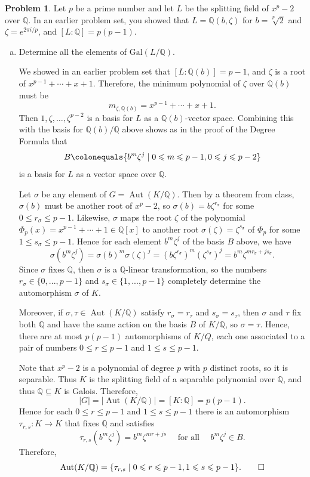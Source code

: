 \documentclass[11pt]{article}
\DeclareMathOperator{\Aut}{Aut}
\newcommand{\Q}{\mathbb{Q}}
\theoremstyle{definition}
\newtheorem{problem}{Problem}
\begin{document}
\begin{problem}
Let $p$ be a prime number and let $L$ be the splitting field of $x^p-2$ over $\Q$. In an earlier problem set, you showed that $L = \Q(b,\zeta)$ for $b = \sqrt[p]{2}$ and $\zeta = e^{2\pi i/p}$, and $[L : \Q] = p(p-1)$.
\begin{enumerate}[(a)]
\item  Determine all the elements of $\mathrm{Gal}(L/\Q)$.

We showed in an earlier problem set that $[L:\Q(b)] = p-1$, and $\zeta$ is a root of $x^{p-1}+ \cdots +x+1$. Therefore, the minimum polynomial of $\zeta$ over $\Q(b)$ must be
$$m_{\zeta,\Q(b)} = x^{p-1}+ \cdots +x+1.$$
Then $1,\zeta, \ldots,\zeta^{p-2}$ is a basis for $L$ as a $\Q(b)$-vector space.
Combining this with the basis for $\Q(b)/\Q$ above shows as in the proof of the Degree Formula that
$$B \colonequals \{b^m \zeta^j \mid 0 \leqslant m \leqslant p-1, 0 \leqslant j \leqslant p-2\}$$
is a basis for $L$ as a vector space over $\Q$.

Let $\sigma$ be any element of $G = \Aut(K/\Q)$. Then by a theorem from class, $\sigma(b)$ must be another root of $x^p-2$, so $\sigma(b) = b\zeta^{r_\sigma}$ for some $0 \leqslant r_\sigma \leqslant p-1$. 
Likewise, $\sigma$ maps the root $\zeta$ of the polynomial $\Phi_p(x)=x^{p-1}+ \cdots +1 \in \Q[x]$ to another root $\sigma(\zeta) = \zeta^{s_\sigma}$ of $\Phi_p$ for some $1 \leqslant s_\sigma \leqslant p-1$. Hence for each element $b^m\zeta^j$ of the basis $B$ above, we have 
$$\sigma(b^m\zeta^j) = \sigma(b)^m\sigma(\zeta)^j = (b\zeta^{r_\sigma})^m (\zeta^{s_\sigma})^j = b^m\zeta^{mr_\sigma+js_\sigma}.$$ 
Since $\sigma$ fixes $\Q$, then $\sigma$ is a $\Q$-linear transformation, so the numbers  $r_\sigma \in \{0,...,p-1\}$ and $s_\sigma \in \{1,...,p-1\}$ completely determine the automorphism $\sigma$ of $K$.

Moreover, if $\sigma,\tau \in \Aut(K/\Q)$ satisfy $r_\sigma=r_\tau$ and $s_\sigma=s_\tau$, then $\sigma$ and $\tau$ fix both $\Q$ and have the same action on the basis  $B$ of $K/\Q$, so $\sigma=\tau$.
Hence, there are at most $p(p-1)$ automorphisms of $K/Q$, each one associated to a pair of numbers $0 \leqslant r \leqslant p-1$ and $1 \leqslant s \leqslant p-1$.  

Note that $x^p-2$ is a polynomial of degree $p$ with $p$ distinct roots, so it is separable. Thus $K$ is the splitting field of a separable polynomial over $\Q$, and thus $\Q \subseteq K$ is Galois. Therefore,
$$|G|=|\Aut(K/\Q)|=[K:\Q]=p(p-1).$$  
Hence for each $0 \leqslant r \leqslant p-1$ and $1 \leqslant s \leqslant p-1$ there is an automorphism $\tau_{r,s}:K \to K$ that fixes $\Q$ and satisfies 
$$\tau_{r,s}(b^m\zeta^j) = b^m\zeta^{mr+js} \quad \textrm{ for all } \quad b^m\zeta^j \in B.$$ 
Therefore,
$$\Aut(K/\Q) = \{\tau_{r,s} \mid 0 \leqslant r \leqslant p-1, 1 \leqslant s \leqslant p-1\}.\qedhere$$



\end{enumerate}
\end{problem}
\end{document}
